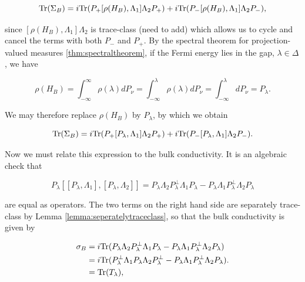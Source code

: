 \documentclass[12pt, letterpaper]{article}
\begin{document}
\[\text{Tr}(\Sigma_B) = i\text{Tr}(P_+[\rho(H_B),\Lambda_1]\Lambda_2P_+) + i\text{Tr}(P_-[\rho(H_B),\Lambda_1]\Lambda_2P_-),\]


since $[\rho(H_B),\Lambda_1]\Lambda_2$ is trace-class (need to add) which allows us to cycle and cancel the terms with both $P_-$ and $P_+$. By the spectral theorem for projection-valued measures \ref{thm:spectraltheorem}, if the Fermi energy lies in the gap, $\lambda \in \Delta$, we have

\[ \rho(H_B) = \int_{-\infty}^\infty \rho(\lambda) dP_\nu = \int_{-\infty}^\lambda \rho(\lambda) dP_\nu = \int_{-\infty}^\lambda dP_\nu = P_\lambda.\]

We may therefore replace $\rho(H_B)$ by $P_\lambda$, by which we obtain

\[\text{Tr}(\Sigma_B) = i\text{Tr}(P_+[P_\lambda,\Lambda_1]\Lambda_2P_+) + i\text{Tr}(P_-[P_\lambda,\Lambda_1]\Lambda_2P_-).\]

Now we must relate this expression to the bulk conductivity. It is an algebraic check that 

\[P_\lambda[[P_\lambda,\Lambda_1],[P_\lambda,\Lambda_2]] = P_\lambda\Lambda_2P_\lambda^\perp\Lambda_1P_\lambda - P_\lambda\Lambda_1P_\lambda^\perp\Lambda_2P_\lambda\]

are equal as operators. The two terms on the right hand side are separately trace-class by Lemma \ref{lemma:seperatelytraceclass}, so that the bulk conductivity is given by

\[\begin{aligned}
\sigma_B &= i\text{Tr}(P_\lambda\Lambda_2 P_\lambda^\perp \Lambda_1P_\lambda - P_\lambda\Lambda_1 P_\lambda^\perp \Lambda_2 P_\lambda)\\
&= i\text{Tr}(P_\lambda^\perp \Lambda_1 P_\lambda\Lambda_2P_\lambda^\perp - P_\lambda\Lambda_1 P_\lambda^\perp \Lambda_2P_\lambda ). \\
&= \text{Tr}(T_\lambda),
\end{aligned} \]
\end{document}
